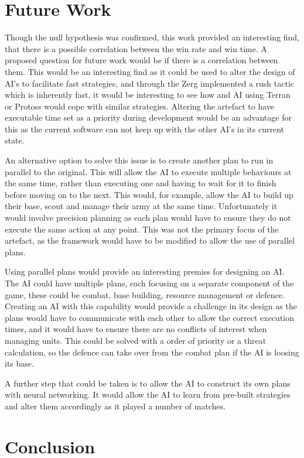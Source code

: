 \documentclass[journal]{IEEEtran}
\begin{document}
\section{Future Work}
Though the null hypothesis was confirmed, this work provided an interesting find, that there is a possible correlation between the win rate and win time. A proposed question for future work would be if there is a correlation between them. This would be an interesting find as it could be used to alter the design of AI's to facilitate fast strategies, and through the Zerg implemented a rush tactic which is inherently fast, it would be interesting to see how and AI using Terran or Protoss would cope with similar strategies.
Altering the artefact to have executable time set as a priority during development would be an advantage for this as the current software can not keep up with the other AI's in its current state.

An alternative option to solve this issue is to create another plan to run in parallel to the original. This will allow the AI to execute multiple behaviours at the same time, rather than executing one and having to wait for it to finish before moving on to the next. This would, for example, allow the AI to build up their base, scout and manage their army at the same time. Unfortunately it would involve precision planning as each plan would have to ensure they do not execute the same action at any point. This was not the primary focus of the artefact, as the framework would have to be modified to allow the use of parallel plans.

Using parallel plans would provide an interesting premiss for designing an AI. The AI could have multiple plans, each focusing on a separate component of the game, these could be combat, base building, resource management or defence. Creating an AI with this capability would provide a challenge in its design as the plans would have to communicate with each other to allow the correct execution times, and it would have to ensure there are no conflicts of interest when managing units. This could be solved with a order of priority or a threat calculation, so the defence can take over from the combat plan if the AI is loosing its base.

A further step that could be taken is to allow the AI to construct its own plans with neural networking. It would allow the AI to learn from pre-built strategies and alter them accordingly as it played a number of matches.

\section{Conclusion}
\end{document}
